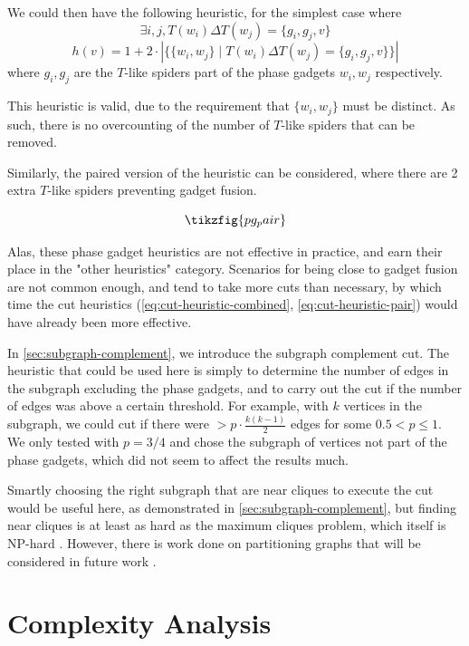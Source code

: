 We could then have the following heuristic, for the simplest case where 
\[\exists i,j, T(w_i) \Delta T(w_j) = \{g_i,g_j,v\}\]
\begin{equation}
    h(v) = 1 + 2\cdot \left|\{\{w_i,w_j\} \mid T(w_i) \Delta T(w_j) = \{g_i,g_j,v\}\}\right|
\end{equation}
where $g_i,g_j$ are the $T$-like spiders part of the phase gadgets $w_i,w_j$ respectively.

This heuristic is valid, due to the requirement that $\{w_i,w_j\}$ must be distinct.
As such, there is no overcounting of the number of $T$-like spiders that can be removed.

Similarly, the paired version of the heuristic can be considered,
where there are 2 extra $T$-like spiders preventing gadget fusion.

\begin{equation}
    \tikzfig{pg_pair}
\end{equation}


Alas, these phase gadget heuristics are not effective in practice,
and earn their place in the "other heuristics" category.
Scenarios for being close to gadget fusion are not common enough, and tend to take more cuts than necessary,
by which time the cut heuristics (\ref{eq:cut-heuristic-combined}, \ref{eq:cut-heuristic-pair}) 
would have already been more effective.

In \autoref{sec:subgraph-complement}, we introduce the subgraph complement cut.
The heuristic that could be used here is simply to determine the number of edges 
in the subgraph excluding the phase gadgets,
and to carry out the cut if the number of edges was above a certain threshold.
For example, with $k$ vertices in the subgraph, we could cut if there were 
$>p\cdot\frac{k(k-1)}{2}$ edges for some $0.5 < p \leq 1$.
We only tested with $p=3/4$ and chose the subgraph of vertices not part of the phase gadgets, 
which did not seem to affect the results much.

Smartly choosing the right subgraph that are near cliques to execute the cut would be useful here,
as demonstrated in \autoref{sec:subgraph-complement},
but finding near cliques is at least as hard as the maximum cliques problem, 
which itself is NP-hard \cite{behera2022}.
However, there is work done on partitioning graphs that will be considered 
in future work \cite{sutcliffe2024part}.

\section{Complexity Analysis}
\label{sec:complexity}

